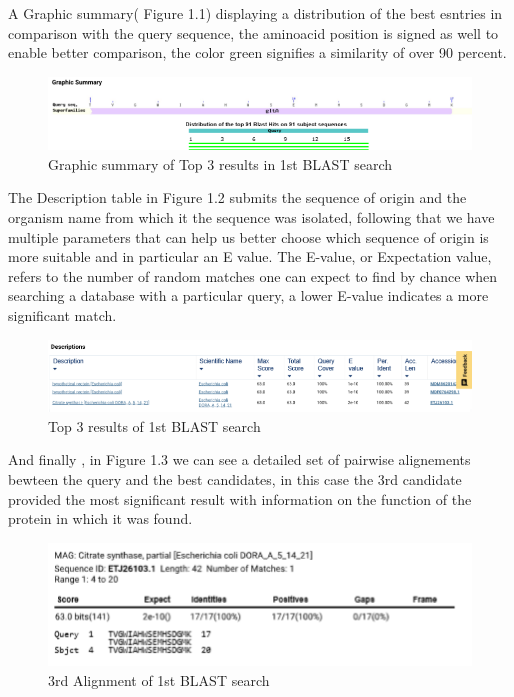 \documentclass[a4paper,english,12pt,bibliography=totoc]{scrreprt}
\begin{document}
A Graphic summary( Figure 1.1) displaying  a distribution of the best esntries in comparison with the query sequence, the aminoacid position is signed as well to enable better comparison, the color green signifies a similarity of over 90 percent.
\begin{figure}[H]
    \centering
    \includegraphics[width=0.9\linewidth]{Project 1/graphicsummary1.png}
    \caption{Graphic summary of Top 3 results in 1st BLAST search}
    \label{fig:enter-label}
\end{figure}

The Description table in Figure 1.2  submits the sequence of origin and the organism name from which it the sequence was isolated, following that we have multiple parameters that can help us better choose which sequence of origin is more suitable and  in particular an E value. The E-value, or Expectation value, refers to the number of random matches one can expect to find by chance when searching a database with a particular query, a lower E-value indicates a more significant match. 

\begin{figure}[H]
    \centering
    \includegraphics[width=0.9\linewidth]{Project 1/Description1.png}
    \caption{Top 3 results of 1st BLAST search}
    \label{fig:enter-label}
\end{figure}

And finally , in Figure 1.3 we can see a detailed set of pairwise alignements bewteen the query and the best candidates, in this case the 3rd candidate provided the most significant result with information on the function of the protein in which it was found.

\begin{figure}[H]
    \centering
    \includegraphics[width=0.9\linewidth]{Project 1/AlignedSequence.png}
    \caption{3rd Alignment of 1st BLAST search}
    \label{fig:enter-label}
\end{figure}
\end{document}
